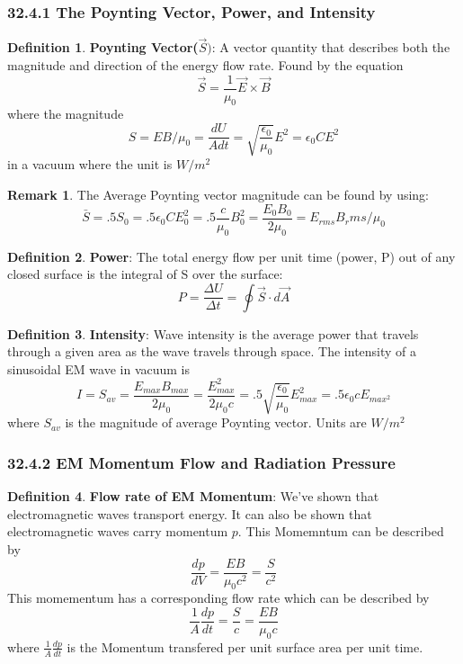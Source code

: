 \documentclass[12pt]{amsart}
\theoremstyle{definition}
\newtheorem{definition}{Definition} %
\newtheorem*{remark}{Remark}        %
\numberwithin{equation}{theorem}    %
\begin{document}
\subsubsection*{32.4.1 The Poynting Vector, Power, and Intensity}
\begin{definition}
    \textbf{Poynting Vector($\vec{S})$}:
    A vector quantity that describes both the magnitude and direction of the energy flow rate. Found by the equation
    $$\vec{S}=\frac{1}{\mu_0}\vec{E}\times\vec{B}$$ where the magnitude $$S = EB/\mu_0 =\frac{dU}{Adt} =\sqrt{\frac{\epsilon_0}{\mu_0}}E^2 = \epsilon_0CE^2$$ in a vacuum where the unit is $W/m^2$ 
    \begin{remark}
    The Average Poynting vector magnitude can be found by using:
    $$\bar{S} = .5S_0 = .5\epsilon_0CE_0^2 = .5\frac{c}{\mu_0}B_0^2=\frac{E_0B_0}{2\mu_0} = E_{rms}{B_rms}/\mu_0$$
    \end{remark}
\end{definition}

\begin{definition}
    \textbf{Power}:
    The total energy flow per unit time (power, P) out of any closed surface is the integral of S over the surface:
    $$P = \frac{\Delta U}{\Delta t} = \oint\vec{S}\cdot d\vec{A} $$
\end{definition}

\begin{definition}
    \textbf{Intensity}:
    Wave intensity is the average power that travels through a given area as the wave travels through space. The intensity of a sinusoidal EM wave in vacuum is 
    $$I = S_{av} = \frac{E_{max}B_{max}}{2\mu_0} = \frac{E_{max}^2}{2\mu_0c} = .5\sqrt{\frac{\epsilon_0}{\mu_0}}E_{max}^2 = 
    .5\epsilon_0cE_{max{^2}}$$ where $S_{av}$ is the magnitude of average Poynting vector. Units are $W/m^2$
\end{definition}

\subsubsection*{32.4.2 EM Momentum Flow and Radiation Pressure}

\begin{definition}
    \textbf{Flow rate of EM Momentum}:
    We’ve shown that electromagnetic waves transport energy. It can also be shown that electromagnetic waves carry momentum $p$. This Momemntum can be described by $$\frac{dp}{dV} = \frac{EB}{\mu_0c^2} = \frac{S}{c^2}$$ This momementum has a corresponding flow rate which can be described by 
    $$\frac{1}{A}\frac{dp}{dt} = \frac{S}{c} = \frac{EB}{\mu_0c}$$ where $\frac{1}{A}\frac{dp}{dt} $ is the Momentum transfered per unit surface area per unit time.
\end{definition}
\end{document}
